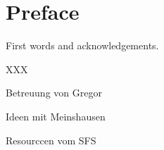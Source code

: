 \chapter*{Preface}

First words and acknowledgements.

XXX

Betreuung von Gregor

Ideen mit Meinshausen

Resourccen vom SFS

